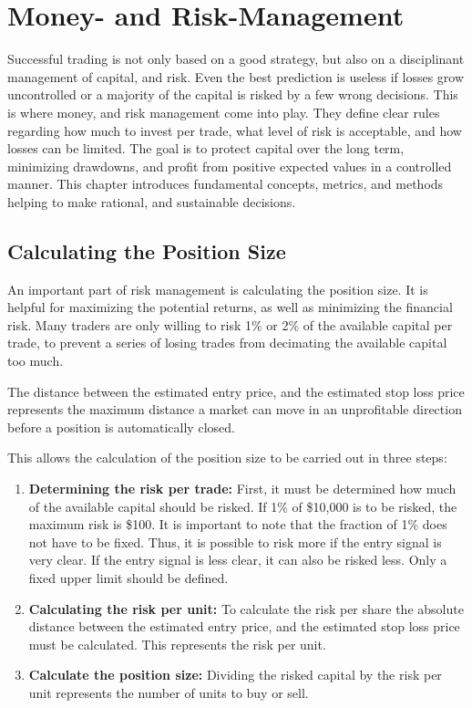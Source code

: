 \section{Money- and Risk-Management}

Successful trading is not only based on a good strategy, but also on a disciplinant management of capital, and risk.
Even the best prediction is useless if losses grow uncontrolled or a majority of the capital is risked by a few wrong decisions.
This is where money, and risk management come into play.
They define clear rules regarding how much to invest per trade, what level of risk is acceptable, and how losses can be limited.
The goal is to protect capital over the long term, minimizing drawdowns, and profit from positive expected values in a controlled manner.
This chapter introduces fundamental concepts, metrics, and methods helping to make rational, and sustainable decisions.

\subsection{Calculating the Position Size}

An important part of risk management is calculating the position size.
It is helpful for maximizing the potential returns, as well as minimizing the financial risk.
Many traders are only willing to risk 1\% or 2\% of the available capital per trade, to prevent a series of losing trades from decimating the available capital too much.

The distance between the estimated entry price, and the estimated stop loss price represents the maximum distance a market can move in an unprofitable direction before a position is automatically closed.

This allows the calculation of the position size to be carried out in three steps:

\begin{enumerate}
    \item \textbf{Determining the risk per trade:} First, it must be determined how much of the available capital should be risked.
    If 1\% of \$10,000 is to be risked, the maximum risk is \$100.
    It is important to note that the fraction of 1\% does not have to be fixed.
    Thus, it is possible to risk more if the entry signal is very clear.
    If the entry signal is less clear, it can also be risked less.
    Only a fixed upper limit should be defined.
    \item \textbf{Calculating the risk per unit:} To calculate the risk per share the absolute distance between the estimated entry price, and the estimated stop loss price must be calculated.
    This represents the risk per unit.
    \item \textbf{Calculate the position size:} Dividing the risked capital by the risk per unit represents the number of units to buy or sell.
\end{enumerate}

